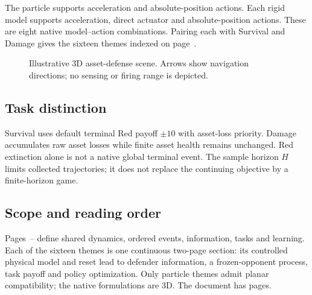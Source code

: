 \documentclass[journal,a4paper,10pt]{IEEEtran}
\newcommand{\subhead}[1]{\subsection{#1}}
\begin{document}
The particle supports acceleration and absolute-position actions. Each rigid model supports acceleration, direct actuator and absolute-position actions. These are eight native model--action combinations. Pairing each with Survival and Damage gives the sixteen themes indexed on page~\pageref{common:learning}.
\begin{figure}[!b]
\centering
{}
\caption{Illustrative 3D asset-defense scene. Arrows show navigation directions; no sensing or firing range is depicted.}
\label{fig:scenario}
\end{figure}
\subhead{Task distinction}
Survival uses default terminal Red payoff $\pm10$ with asset-loss priority. Damage accumulates raw asset losses while finite asset health remains unchanged. Red extinction alone is not a native global terminal event. The sample horizon $H$ limits collected trajectories; it does not replace the continuing objective by a finite-horizon game.
\subhead{Scope and reading order}
Pages~\pageref{common:transition}--\pageref{common:learning} define shared dynamics, ordered events, information, tasks and learning. Each of the sixteen themes is one continuous two-page section: its controlled physical model and reset lead to defender information, a frozen-opponent process, task payoff and policy optimization. Only particle themes admit planar compatibility; the native formulations are 3D. The document has \pageref{document:end} pages.
\end{document}

